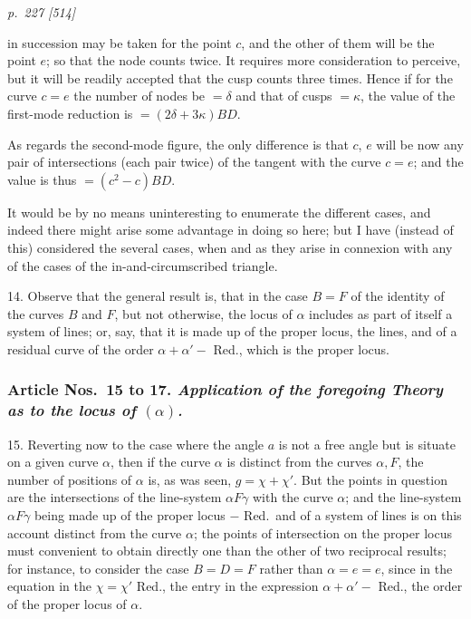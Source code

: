 \documentclass[11pt,a4paper]{article}
\theoremstyle{plain}
\theoremstyle{definition}
\begin{document}
\clearpage

\bigskip
\textit{p.~227 [514]}
\smallskip

in succession may be taken for the point $c$, and the other of them will be the
point $e$; so that the node counts twice.  It requires more consideration to perceive,
but it will be readily accepted that the cusp counts three times.  Hence if for the
curve $c=e$ the number of nodes be $=\delta$ and that of cusps $=\kappa$, the value of the
first-mode reduction is $=(2\delta+3\kappa)BD$.

As regards the second-mode figure, the only difference is that $c$, $e$ will be now
any pair of intersections (each pair twice) of the tangent with the curve $c=e$; and
the value is thus $=(c^2-c)BD$.

It would be by no means uninteresting to enumerate the different cases, and indeed
there might arise some advantage in doing so here; but I have (instead of this) considered
the several cases, when and as they arise in connexion with any of the cases of the
in-and-circumscribed triangle.

14. Observe that the general result is, that in the case $B=F$ of the identity
of the curves $B$ and $F$, but not otherwise, the locus of $\alpha$ includes as part of itself
a system of lines; or, say, that it is made up of the proper locus, the lines, and of a residual curve
of the order $\alpha + \alpha' - $ Red., which is the proper locus.

\bigskip
\subsubsection*{Article Nos.\ 15 to 17.  \textit{Application of the foregoing Theory as to the locus of $(\alpha)$.}}

15. Reverting now to the case where the angle $a$ is not a free angle but is
situate on a given curve $\alpha$, then if the curve $\alpha$ is distinct from the curves $\alpha, F$,
the number of positions of $\alpha$ is, as was seen, $g = \chi + \chi'$.  But the points in question
are the intersections of the line-system $\alpha F\gamma$ with the curve $\alpha$; and the line-system
$\alpha F\gamma$ being made up of the proper locus $- $ Red.\ and of a system of lines is on this
account distinct from the curve $\alpha$; the points of intersection on the proper locus must
convenient to obtain directly one than the other of two reciprocal results; for instance,
to consider the case $B = D = F$ rather than $\alpha = e = e$, since in the equation in the
$\chi=\chi'$ Red., the entry in the expression $\alpha+\alpha'-$ Red., the order of the proper
locus of $\alpha$.
\end{document}
